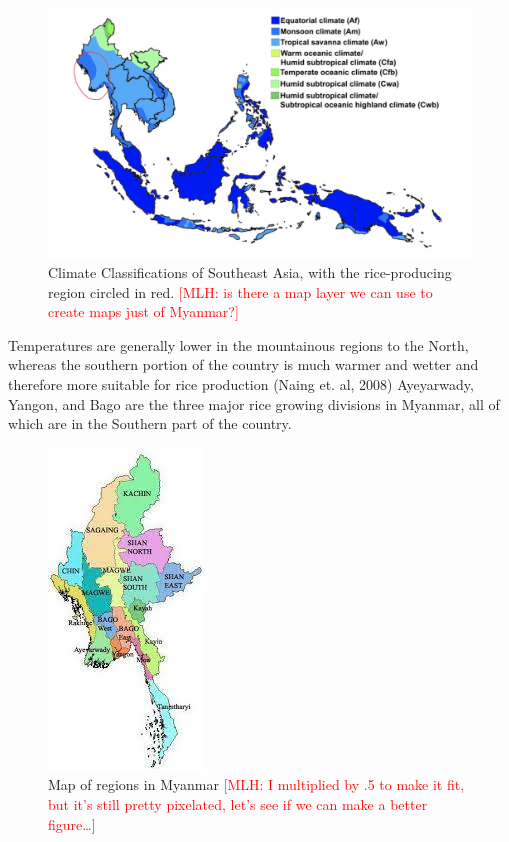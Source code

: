 \documentclass{book}\usepackage{knitr}
\newcommand{\red}[1]{\textcolor{red}{[MLH: #1]}}
\begin{document}
{\begin{figure}
\includegraphics[width=\linewidth]{images/myanmar/Image2.jpg}
\caption{Climate Classifications of Southeast Asia, with the rice-producing region circled in red. \red{is there a map layer we can use to create maps just of Myanmar?}}
\end{figure}

Temperatures are generally lower in the mountainous regions to the North, whereas the southern portion of the country is much warmer and wetter and therefore more suitable for rice production (Naing et. al, 2008) Ayeyarwady, Yangon, and Bago are the three major rice growing divisions in Myanmar, all of which are in the Southern part of the country. 

\begin{figure}
\includegraphics[width=.5\linewidth]{images/myanmar/Image3.jpg}
\caption{Map of regions in Myanmar \red{I multiplied by .5 to make it fit, but it's still pretty pixelated, let's see if we can make a better figure\ldots}}
\end{figure}

}
\end{document}
